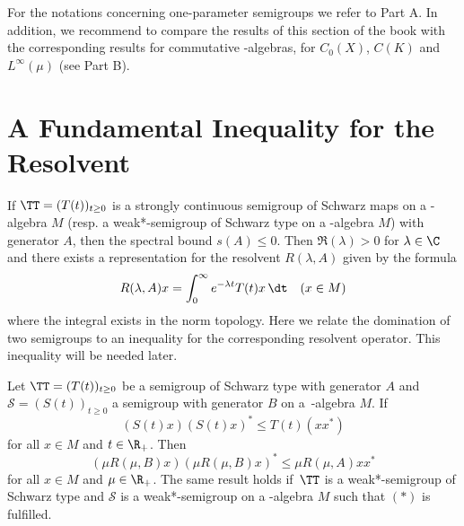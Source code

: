 For the notations concerning one-parameter semigroups we refer to Part A.
In addition, we recommend to compare the results of this section of the book with the corresponding results for commutative \CA-algebras, \ie for $ C_{0}(X) $, $ C(K) $ and $ L^\infty(\mu) $ (see Part B).
\section{A Fundamental Inequality for the Resolvent}\label{sec:d1-2}
If $ \TT = (T(t))_{t \geq 0} $ is a strongly continuous semigroup of Schwarz maps on a \CA-algebra $ M $ (resp. a weak*-semigroup of Schwarz type on a \WA-algebra $ M $) with generator $ A $, then the spectral bound $ s(A) \leq 0 $.
Then $ \Re(\lambda) > 0 $ for $ \lambda \in \C $ and there exists a representation for the resolvent $ R(\lambda,A) $ given by the formula
\[
 	R(\lambda,A)x = \int_{0}^\infty e^{-\lambda t} T(t)x \, \dt  \quad (x \in M)
\]
where the integral exists in the norm topology.
Here we relate the domination of two semigroups to an inequality for the corresponding resolvent operator.
This inequality will be needed later.
\begin{theorem}\label{thm:d1-2.1}
Let $  \TT  = (T(t))_{t\geq0} $ be a semigroup of Schwarz type with generator $ A $ and $ \mathcal{S} = (S(t))_{t\geq0} $ a semigroup with generator $ B $ on a\, \CA-algebra $ M $.
If
\begin{equation}
	(S(t)x)(S(t)x)^{*} \leq T(t)(xx^{*}) \tag{*}
\end{equation}
for all $ x \in M $ and $ t \in \R_{+} $. 
Then 
\[
	\left( \mu R(\mu,B)x \right) \left( \mu R(\mu,B)x \right)^{*} \leq \mu R(\mu,A)xx^{*}
\]
for all $ x \in M $ and $ \mu \in \R_{+} $.
The same result holds if $ \,\TT $ is a weak*-semigroup of Schwarz type and $ \mathcal{S} $ is a weak*-semigroup on a \WA-algebra $ M $ such that $ (*) $ is fulfilled.
\end{theorem}

